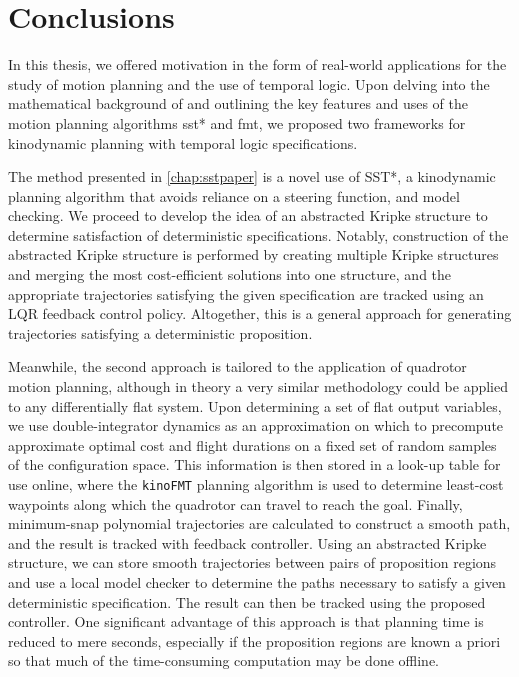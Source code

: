 
\chapter{Conclusions}\label{chap:conc}

In this thesis, we offered motivation in the form of real-world applications for the study of motion planning and the use of temporal logic. Upon delving into the mathematical background of \mucalc{} and outlining the key features and uses of the motion planning algorithms \gls{sst}* and \gls{fmt}, we proposed two frameworks for kinodynamic planning with temporal logic specifications.

The method presented in \autoref{chap:sstpaper} is a novel use of SST*, a kinodynamic planning algorithm that avoids reliance on a steering function, and \mucalc{} model checking. We proceed to develop the idea of an abstracted Kripke structure to determine satisfaction of deterministic \mucalc{} specifications. Notably, construction of the abstracted Kripke structure is performed by creating multiple Kripke structures and merging the most cost-efficient solutions into one structure, and the appropriate trajectories satisfying the given specification are tracked using an LQR feedback control policy. Altogether, this is a general approach for generating trajectories satisfying a deterministic \mucalc{} proposition. 

Meanwhile, the second approach is tailored to the application of quadrotor motion planning, although in theory a very similar methodology could be applied to any differentially flat system. Upon determining a set of flat output variables, we use double-integrator dynamics as an approximation on which to precompute approximate optimal cost and flight durations on a fixed set of random samples of the configuration space. This information is then stored in a look-up table for use online, where the \texttt{kinoFMT} planning algorithm is used to determine least-cost waypoints along which the quadrotor can travel to reach the goal. Finally, minimum-snap polynomial trajectories are calculated to construct a smooth path, and the result is tracked with feedback controller. Using an abstracted Kripke structure, we can store smooth trajectories between pairs of proposition regions and use a local model checker to determine the paths necessary to satisfy a given deterministic \mucalc{} specification. The result can then be tracked using the proposed controller. One significant advantage of this approach is that planning time is reduced to mere seconds, especially if the proposition regions are known a priori so that much of the time-consuming computation may be done offline. 


